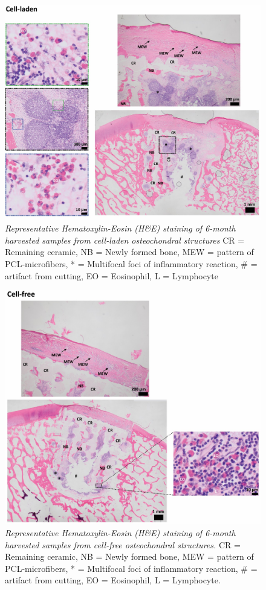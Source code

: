 \documentclass[twocolumn, empirical, authordate, issue]{jote-new-article}
\begin{document}
\begin{figure}[t]
 \includegraphics[width=1.02\columnwidth]{media/image17.jpg}
\caption{\emph{Representative Hematoxylin-Eosin (H\&E) staining of 6-month harvested samples from cell-laden osteochondral structures}  CR = Remaining ceramic, NB = Newly formed bone, MEW = pattern of PCL-microfibers, * = Multifocal foci of inflammatory reaction, \# = artifact from cutting, EO = Eosinophil, L = Lymphocyte}
\label{fig:sup6}\end{figure}


\begin{figure}[b]
 \includegraphics[width=\columnwidth]{media/image18.jpg}
\caption{\emph{Representative Hematoxylin-Eosin (H\&E) staining of 6-month harvested samples from cell-free osteochondral structures.}  CR = Remaining ceramic, NB = Newly formed bone, MEW = pattern of PCL-microfibers, * = Multifocal foci of inflammatory reaction, \# = artifact from cutting, EO = Eosinophil, L = Lymphocyte.}
\label{fig:sup7}\end{figure}
\end{document}
